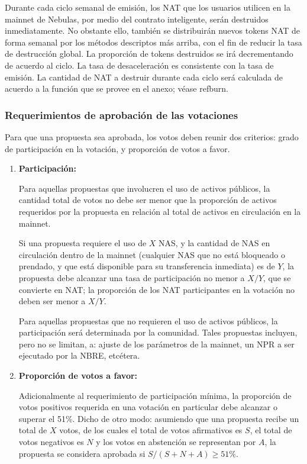 Durante cada ciclo semanal de emisión, los NAT que los usuarios utilicen en la mainnet de Nebulas, por medio del contrato inteligente, serán destruidos inmediatamente. No obstante ello, también se distribuirán nuevos tokens NAT de forma semanal por los métodos descriptos más arriba, con el fin de reducir la tasa de destrucción global. La proporción de tokens destruidos se irá decrementando de acuerdo al ciclo. La tasa de desaceleración es consistente con la tasa de emisión. La cantidad de NAT a destruir durante cada ciclo será calculada de acuerdo a la función que se provee en el anexo; véase ref{burn}.

\subsubsection{Requerimientos de aprobación de las votaciones}

Para que una propuesta sea aprobada, los votos deben reunir dos criterios: grado de participación en la votación, y proporción de votos a favor.

\begin{enumerate}
	\item

	\textbf{Participación:}

	Para aquellas propuestas que involucren el uso de activos públicos, la cantidad total de votos no debe ser menor que la proporción de activos requeridos por la propuesta en relación al total de activos en circulación en la mainnet.

	Si una propuesta requiere el uso de $X$ NAS, y la cantidad de NAS en circulación dentro de la mainnet (cualquier NAS que no está bloqueado o prendado, y que está disponible para su transferencia inmediata) es de $Y$, la propuesta debe alcanzar una tasa de participación no menor a
	$X/Y$, que se convierte en NAT; la proporción de los NAT participantes en la votación no deben ser menor a $X/Y$.

	Para aquellas propuestas que no requieren el uso de activos públicos, la participación será determinada por la comunidad. Tales propuestas incluyen, pero no se limitan, a: ajuste de los parámetros de la mainnet, un NPR a ser ejecutado por la NBRE, etcétera.

	\item

	\textbf{Proporción de votos a favor:}

	Adicionalmente al requerimiento de participación mínima, la proporción de votos positivos requerida en una votación en particular debe alcanzar o superar el 51\%.
	Dicho de otro modo: asumiendo que una propuesta recibe un total de $X$ votos, de los cuales el total de votos afirmativos es $S$, el total de votos negativos es $N$ y los votos en abstención se representan por $A$, la propuesta se considera aprobada si $S/(S+N+A) \ge 51\%$.

\end{enumerate}

